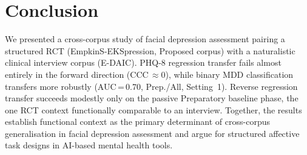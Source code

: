 \documentclass[sigconf]{acmart}
\begin{document}
\section{Conclusion}

We presented a cross-corpus study of facial depression assessment pairing a structured
RCT (EmpkinS-EKSpression, Proposed corpus) with a naturalistic clinical interview corpus
(E-DAIC). PHQ-8 regression transfer fails almost entirely in the forward direction
(CCC\,$\approx 0$), while binary MDD classification transfers more robustly
(AUC\,=\,0.70, Prep./All, Setting~1). Reverse regression transfer succeeds modestly
only on the passive Preparatory baseline phase, the one RCT context functionally comparable
to an interview. Together, the results establish functional context as the primary
determinant of cross-corpus generalisation in facial depression assessment and argue
for structured affective task designs in AI-based mental health tools.




\end{document}

